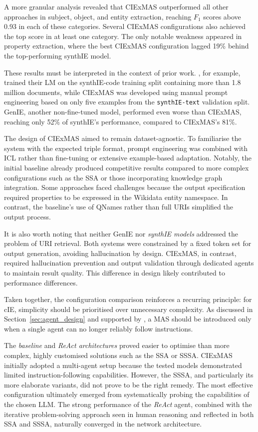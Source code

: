 \documentclass[a4paper,oneside,bibliography=totoc]{scrbook}
\begin{document}
A more granular analysis revealed that CIExMAS outperformed all other approaches in subject, object, and entity extraction, reaching $F_{1}$ scores above 0.93 in each of these categories. Several CIExMAS configurations also achieved the top score in at least one category. The only notable weakness appeared in property extraction, where the best CIExMAS configuration lagged 19\% behind the top-performing synthIE model.

These results must be interpreted in the context of prior work. \citet{Josifoski2023}, for example, trained their \ac{LM} on the synthIE-code training split containing more than 1.8 million documents, while CIExMAS was developed using manual prompt engineering based on only five examples from the \texttt{synthIE-text} validation split. GenIE, another non-fine-tuned model, performed even worse than CIExMAS, reaching only 52\% of synthIE’s performance, compared to CIExMAS’s 81\%.

The design of CIExMAS aimed to remain dataset-agnostic. To familiarise the system with the expected triple format, prompt engineering was combined with \ac{ICL} rather than fine-tuning or extensive example-based adaptation. Notably, the initial baseline already produced competitive results compared to more complex configurations such as the \ac{SSA} or those incorporating knowledge graph integration. Some approaches faced challenges because the output specification required properties to be expressed in the Wikidata entity namespace. In contrast, the baseline’s use of QNames rather than full URIs simplified the output process.

It is also worth noting that neither GenIE nor \textit{synthIE models} addressed the problem of URI retrieval. Both systems were constrained by a fixed token set for output generation, avoiding hallucination by design. CIExMAS, in contrast, required hallucination prevention and output validation through dedicated agents to maintain result quality. This difference in design likely contributed to performance differences.

Taken together, the configuration comparison reinforces a recurring principle: for \ac{cIE}, simplicity should be prioritised over unnecessary complexity. As discussed in Section~\ref{sec:agent_design} and supported by \citet{Anthropic2024}, a \ac{MAS} should be introduced only when a single agent can no longer reliably follow instructions.

The \textit{baseline} and \textit{ReAct architectures} proved easier to optimise than more complex, highly customised solutions such as the \ac{SSA} or \ac{SSSA}. CIExMAS initially adopted a multi-agent setup because the tested models demonstrated limited instruction-following capabilities. However, the \ac{SSSA}, and particularly its more elaborate variants, did not prove to be the right remedy. The most effective configuration ultimately emerged from systematically probing the capabilities of the chosen \ac{LLM}. The strong performance of the \textit{ReAct} agent, combined with the iterative problem-solving approach seen in human reasoning and reflected in both \ac{SSA} and \ac{SSSA}, naturally converged in the network architecture.
\end{document}
